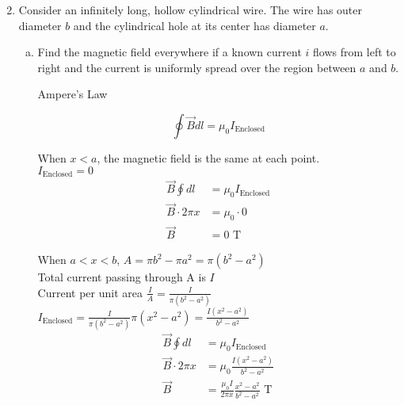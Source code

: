 \documentclass[fleqn]{article}
\begin{document}
	\begin{enumerate}
		\setcounter{enumi}{1}
		\item 
			Consider an infinitely long, hollow cylindrical wire. The wire has outer diameter $b$ and the cylindrical hole at its center has diameter $a$.
			\begin{enumerate}[a)]
				\item 
					Find the magnetic field everywhere if a known current $i$ flows from left to right and the current is uniformly spread over the region between $a$ and $b$.\\
					\begin{center}
						Ampere's Law
					\end{center}
					$$\oint\vec{B}dl = \mu_0I_{\text{Enclosed}}$$

					When $x<a$, the magnetic field is the same at each point.\\
					$I_{\text{Enclosed}} = 0$
					\begin{align*}
						\vec{B}\oint dl &= \mu_0I_{\text{Enclosed}}\\
						\vec{B}\cdot2\pi x &= \mu_0 \cdot 0\\
						\vec{B} &= 0\text{ T}
					\end{align*}

					When $a<x<b$,
					$A = \pi b^2 - \pi a^2 = \pi( b^2 - a^2 )$\\
					Total current passing through A is $I$\\
					Current per unit area $\frac{I}{A} = \frac{I}{\pi( b^2 - a^2 )}$\\
					$I_{\text{Enclosed}} = \frac{I}{\pi( b^2 - a^2 )} \pi( x^2 - a^2 ) = \frac{I( x^2 - a^2 )}{ b^2 - a^2 }$
					\begin{align*}
						\vec{B}\oint dl &= \mu_0I_{\text{Enclosed}}\\
						\vec{B}\cdot2\pi x &= \mu_0 \frac{I( x^2 - a^2 )}{ b^2 - a^2 }\\
						\vec{B} &= \frac{\mu_0 I}{2\pi x}\frac{x^2 - a^2}{ b^2 - a^2 }\text{ T}
					\end{align*}


\end{enumerate}
\end{enumerate}
\end{document}
